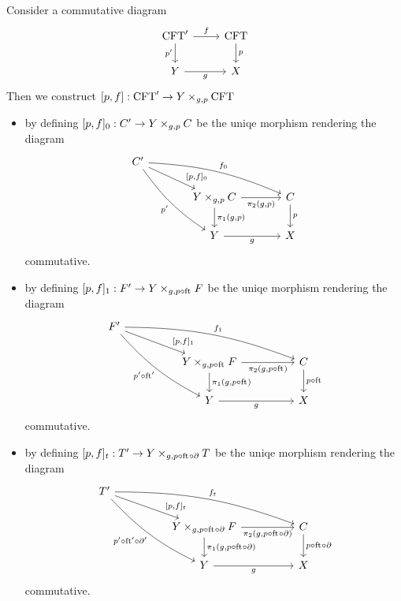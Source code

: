\begin{defn}\label{cobesys-existence}
Consider a commutative diagram
\begin{equation*}
\begin{tikzcd}
\stesys'
  \ar{r}{f}
  \ar{d}[swap]{p'}
  &
\stesys
  \ar{d}{p}
  \\
Y \ar{r}[swap]{g}
  &
X
\end{tikzcd}
\end{equation*}
Then we construct $[p,f]:\stesys'\to\cobesys{Y}{\stesys}{g}{p}$
\begin{itemize}
\item by defining $[p,f]_0:\stesysc'\to\pullback{Y}{\stesysc}{g}{p}$ be the uniqe
morphism rendering the diagram
\begin{equation*}
\begin{tikzcd}[column sep=large]
\stesysc'
  \ar[bend right=10]{ddr}[swap]{p'}
  \ar[bend left=10]{rrd}{f_0}
  \ar{dr}[near end]{[p,f]_0}
  \\
  {}&
\pullback{Y}{\stesysc}{g}{p}
  \ar{r}[swap]{\pullbackpr{2}{g}{p}}
  \ar{d}{\pullbackpr{1}{g}{p}}
  &
\stesysc
  \ar{d}{p}
  \\
  {}&
Y \ar{r}[swap]{g}
  &
X
\end{tikzcd}
\end{equation*}
commutative.
\item by defining $[p,f]_1:\stesysf'\to\pullback{Y}{\stesysf}{g}{p\circ\eft}$ be the uniqe
morphism rendering the diagram
\begin{equation*}
\begin{tikzcd}[column sep=huge]
\stesysf'
  \ar[bend right=10]{ddr}[swap]{p'\circ\eft'}
  \ar[bend left=10]{rrd}{f_1}
  \ar{dr}[near end]{[p,f]_1}
  \\
  {}&
\pullback{Y}{\stesysf}{g}{p\circ\eft}
  \ar{r}[swap]{\pullbackpr{2}{g}{p\circ\eft}}
  \ar{d}{\pullbackpr{1}{g}{p\circ\eft}}
  &
\stesysc
  \ar{d}{p\circ\eft}
  \\
  {}&
Y \ar{r}[swap]{g}
  &
X
\end{tikzcd}
\end{equation*}
commutative.
\item by defining $[p,f]_t:\stesyst'\to\pullback{Y}{\stesyst}{g}{p\circ\eft\circ\ebd}$ be the uniqe
morphism rendering the diagram
\begin{equation*}
\begin{tikzcd}[column sep=huge]
\stesyst'
  \ar[bend right=10]{ddr}[swap]{p'\circ\eft'\circ\ebd'}
  \ar[bend left=10]{rrd}{f_t}
  \ar{dr}[near end]{[p,f]_t}
  \\
  {}&
\pullback{Y}{\stesysf}{g}{p\circ\eft\circ\ebd}
  \ar{r}[swap]{\pullbackpr{2}{g}{p\circ\eft\circ\ebd}}
  \ar{d}{\pullbackpr{1}{g}{p\circ\eft\circ\ebd}}
  &
\stesysc
  \ar{d}{p\circ\eft\circ\ebd}
  \\
  {}&
Y \ar{r}[swap]{g}
  &
X
\end{tikzcd}
\end{equation*}
commutative.
\end{itemize}
\end{defn}

